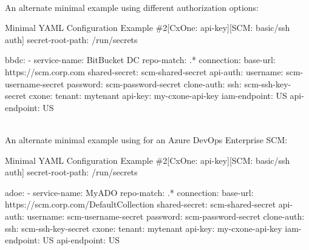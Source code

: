 \pagebreak
\noindent\\An alternate minimal example using different authorization options:

\begin{code}{Minimal YAML Configuration Example \#2}{[CxOne: api-key]}{[SCM: basic/ssh auth]}
secret-root-path: /run/secrets

bbdc:
    - service-name: BitBucket DC
      repo-match: .*
      connection:
      base-url: https://scm.corp.com
      shared-secret: scm-shared-secret
      api-auth:
          username: scm-username-secret
          password: scm-password-secret
      clone-auth:
          ssh: scm-ssh-key-secret
      cxone:
        tenant: mytenant
        api-key: my-cxone-api-key
        iam-endpoint: US
        api-endpoint: US
\end{code}
    
\pagebreak
\noindent\\An alternate minimal example using for an Azure DevOps Enterprise
SCM:

\begin{code}{Minimal YAML Configuration Example \#2}{[CxOne: api-key]}{[SCM: basic/ssh auth]}
secret-root-path: /run/secrets

adoe:
    - service-name: MyADO
      repo-match: .*
      connection:
      base-url: https://scm.corp.com/DefaultCollection
      shared-secret: scm-shared-secret
      api-auth:
          username: scm-username-secret
          password: scm-password-secret
      clone-auth:
          ssh: scm-ssh-key-secret
      cxone:
        tenant: mytenant
        api-key: my-cxone-api-key
        iam-endpoint: US
        api-endpoint: US
\end{code}
